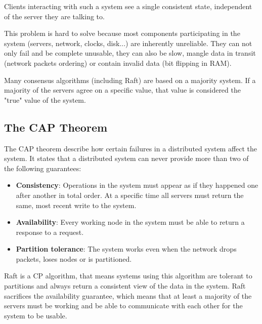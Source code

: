 Clients interacting with such a system see a single consistent state, independent of the server they are talking to.

This problem is hard to solve because most components participating in the system (servers, network, clocks, disk...) are inherently unreliable. They can not only fail and be complete unusable, they can also be slow, mangle data in transit (network packets ordering) or contain invalid data (bit flipping in RAM).

Many consensus algorithms (including Raft) are based on a majority system. If a majority of the servers agree on a specific value, that value is considered the "true" value of the system.

\subsection{The CAP Theorem}
The CAP theorem describe how certain failures in a distributed system affect the system. It states that a distributed system can never provide more than two of the following guarantees: \cite{cap_theorem}

\begin{itemize}
  \item \textbf{Consistency}: Operations in the system must appear as if they happened one after another in total order. At a specific time all servers must return the same, most recent write to the system.
  \item \textbf{Availability}: Every working node in the system must be able to return a response to a request.
  \item \textbf{Partition tolerance}: The system works even when the network drops packets, loses nodes or is partitioned.
\end{itemize}

Raft is a CP algorithm, that means systems using this algorithm are tolerant to partitions and always return a consistent view of the data in the system. Raft sacrifices the availability guarantee, which means that at least a majority of the servers must be working and be able to communicate with each other for the system to be usable.

